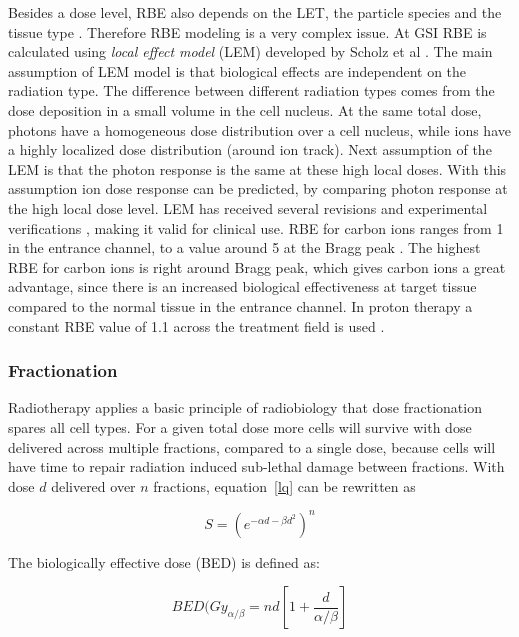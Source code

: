 \documentclass[type=dr, dr=rernat, accentcolor=tud7b,colorbacktitle, bigchapter, openright, twoside, 12pt ]{tudthesis}
\begin{document}
Besides a dose level, RBE also depends on the LET, the particle species and the tissue type \cite{Kraft2000}. Therefore RBE modeling is a very complex issue.
At GSI RBE is calculated using \textit{local effect model} (LEM) developed by Scholz et al \cite{Scholz1994}. The main assumption of LEM model is that biological 
effects are independent on the radiation type. The difference between different radiation types comes from the dose deposition in a small volume in the cell nucleus.
At the same total dose, photons have a homogeneous dose distribution over a cell nucleus, while ions have a highly localized dose distribution (around ion track).
Next assumption of the LEM is that the photon response is the same at these high local doses. With this assumption ion dose response can be predicted, by comparing
photon response at the high local dose level. LEM has received several revisions \cite{Elsaesser2006, Elsaesser2007, Elsaesser2009} and experimental verifications
\cite{Mitaroff1998, Kraemer2000a, Kraemer2003}, making it valid for clinical use. RBE for carbon ions ranges from 1 in the entrance channel, to a value around 5 at 
the Bragg peak \cite{Kraft2000}. The highest RBE for carbon ions is right around Bragg peak, which gives carbon ions a great advantage, since there is an increased 
biological effectiveness at target tissue compared to the normal tissue in the entrance channel. In proton therapy a constant RBE value of 1.1 across the treatment field
is used \cite{Paganetti2002}.

\subsubsection{Fractionation}

Radiotherapy applies a basic principle of radiobiology that dose fractionation spares all cell types. For a given total dose
more cells will survive with dose delivered across multiple fractions, compared to a single dose, because cells will have time to repair
radiation induced sub-lethal damage between fractions.
With dose $d$ delivered over $n$ fractions, equation~\ref{lq} can be rewritten as \cite{Shrieve2011}

\begin{equation}
 S = (e^{-\alpha d - \beta d^2})^n
\end{equation}

The biologically effective dose (BED) is defined as:

\begin{equation}
 BED(Gy_{\alpha/\beta}=nd\left[1 + \frac{d}{\alpha/\beta} \right]
\end{equation}
\end{document}
